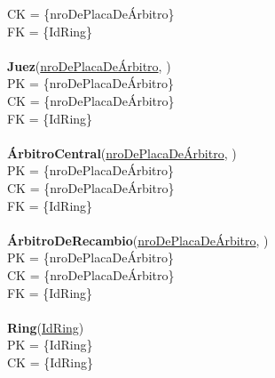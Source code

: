 CK = \{nroDePlacaDeÁrbitro\}\\
FK = \{IdRing\}\\
\\
\textbf{Juez}(\uline{nroDePlacaDeÁrbitro}, )\\
PK = \{nroDePlacaDeÁrbitro\}\\
CK = \{nroDePlacaDeÁrbitro\}\\
FK = \{IdRing\}\\
\\
\textbf{ÁrbitroCentral}(\uline{nroDePlacaDeÁrbitro}, )\\
PK = \{nroDePlacaDeÁrbitro\}\\
CK = \{nroDePlacaDeÁrbitro\}\\
FK = \{IdRing\}\\
\\
\textbf{ÁrbitroDeRecambio}(\uline{nroDePlacaDeÁrbitro}, )\\
PK = \{nroDePlacaDeÁrbitro\}\\
CK = \{nroDePlacaDeÁrbitro\}\\
FK = \{IdRing\}\\
\\
\textbf{Ring}(\uline{IdRing})\\
PK = \{IdRing\}\\
CK = \{IdRing\}\\
